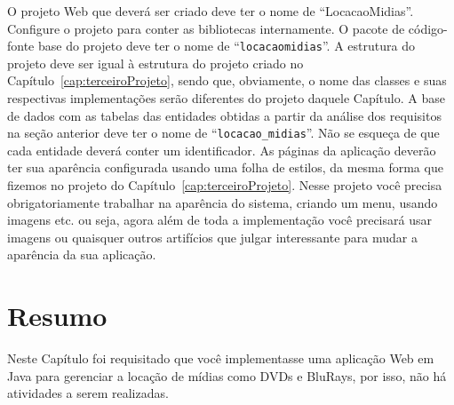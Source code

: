 O projeto Web que deverá ser criado deve ter o nome de ``LocacaoMidias''. Configure o projeto para conter as bibliotecas internamente. O pacote de código-fonte base do projeto deve ter o nome de ``\texttt{locacaomidias}''. A estrutura do projeto deve ser igual à estrutura do projeto criado no Capítulo~\ref{cap:terceiroProjeto}, sendo que, obviamente, o nome das classes e suas respectivas implementações serão diferentes do projeto daquele Capítulo. A base de dados com as tabelas das entidades obtidas a partir da análise dos requisitos na seção anterior deve ter o nome de ``\texttt{locacao\_midias}''. Não se esqueça de que cada entidade deverá conter um identificador. As páginas da aplicação deverão ter sua aparência configurada usando uma folha de estilos, da mesma forma que fizemos no projeto do Capítulo~\ref{cap:terceiroProjeto}. Nesse projeto você precisa obrigatoriamente trabalhar na aparência do sistema, criando um menu, usando imagens etc. ou seja, agora além de toda a implementação você precisará usar imagens ou quaisquer outros artifícios que julgar interessante para mudar a aparência da sua aplicação.


\section{Resumo}

Neste Capítulo foi requisitado que você implementasse uma aplicação Web em Java para gerenciar a locação de mídias como DVDs e BluRays, por isso, não há atividades a serem realizadas.
